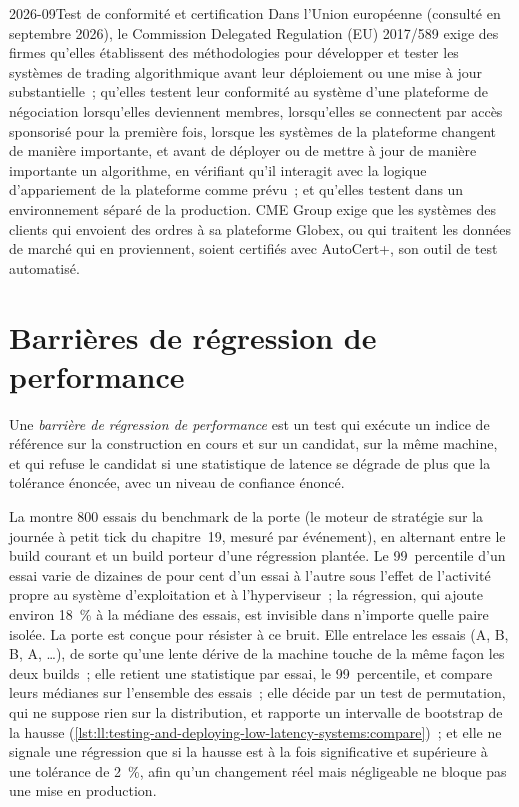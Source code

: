 \begin{dated}{2026-09}{Test de conformité et certification}\label{dat:ll:testing-and-deploying-low-latency-systems:cert}
Dans l'Union européenne (consulté en septembre 2026), le Commission Delegated Regulation (EU) 2017/589 exige des firmes qu'elles établissent
des méthodologies pour développer et tester les systèmes de trading algorithmique avant leur déploiement ou une mise à jour substantielle~; qu'elles testent
leur conformité au système d'une plateforme de négociation lorsqu'elles deviennent membres, lorsqu'elles se connectent par accès sponsorisé pour la première fois,
lorsque les systèmes de la plateforme changent de manière importante, et avant de déployer ou de mettre à jour de manière importante un algorithme, en vérifiant
qu'il interagit avec la logique d'appariement de la plateforme comme prévu~; et qu'elles testent dans un environnement séparé de la production. CME Group
exige que les systèmes des clients qui envoient des ordres à sa plateforme Globex, ou qui traitent les données de marché qui en proviennent, soient certifiés avec AutoCert+,
son outil de test automatisé.
\end{dated}

\section{Barrières de régression de performance}

\begin{definition}\label{def:ll:testing-and-deploying-low-latency-systems:gate}
Une \emph{barrière de régression de performance} est un test qui exécute un indice de référence sur la construction en cours
et sur un candidat, sur la même machine, et qui refuse le candidat si une statistique de latence se dégrade de plus que la
tolérance énoncée, avec un niveau de confiance énoncé.
\end{definition}

La  montre 800
essais du benchmark de la porte (le moteur de stratégie sur la journée à petit tick du chapitre~19, mesuré par événement), en alternant entre le
build courant et un build porteur d'une régression plantée. Le 99~percentile d'un essai varie de dizaines de pour cent d'un essai à
l'autre sous l'effet de l'activité propre au système d'exploitation et à l'hyperviseur~; la régression, qui ajoute environ 18~\% à la médiane des
essais, est invisible dans
n'importe quelle paire isolée. La porte est conçue pour résister à ce bruit. Elle entrelace les essais (A, B, B, A, \dots), de sorte qu'une lente dérive de la
machine touche de la même façon les deux builds~; elle retient une statistique par essai, le 99~percentile, et compare leurs médianes sur l'ensemble des essais~;
elle décide par un test de permutation, qui ne suppose rien sur la distribution, et rapporte un intervalle de bootstrap de la hausse
(\cref{lst:ll:testing-and-deploying-low-latency-systems:compare})~; et elle ne signale une régression que si la hausse est à la fois significative
et supérieure à une tolérance de 2~\%, afin qu'un changement réel mais négligeable ne bloque pas une mise en production.

